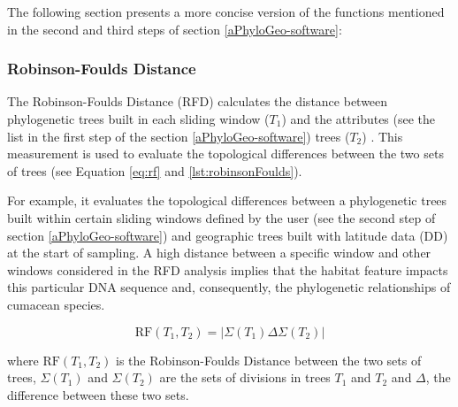 The following section presents a more concise version of the functions mentioned in the second and third steps of section \autoref{aPhyloGeo-software}:

\subsubsection{Robinson-Foulds Distance}\label{RF}
The Robinson-Foulds Distance (RFD) calculates the distance between phylogenetic trees built in each sliding window ($T_1$) and the attributes (see the list in the first step of the section \autoref{aPhyloGeo-software}) trees ($T_2$) \citep{koshkarov_phylogeography_2022}. This measurement is used to evaluate the topological differences between the two sets of trees (see Equation \eqref{eq:rf} and \autoref{lst:robinsonFoulds}).

For example, it evaluates the topological differences between a phylogenetic trees built within certain sliding windows defined by the user (see the second step of section \autoref{aPhyloGeo-software}) and geographic trees built with latitude data (DD) at the start of sampling. A high distance between a specific window and other windows considered in the RFD analysis implies that the habitat feature impacts this particular DNA sequence and, consequently, the phylogenetic relationships of cumacean species.

\begin{equation}\label{eq:rf}
    \text{RF}(T_1, T_2) = | \Sigma(T_1) \Delta \Sigma(T_2) |
\end{equation}

where $\text{RF}(T_1, T_2)$ is the Robinson-Foulds Distance between the two sets of trees, $\Sigma(T_1)$ and $\Sigma(T_2)$ are the sets of divisions in trees $T_1$ and $T_2$ and $ \Delta $, the difference between these two sets.

